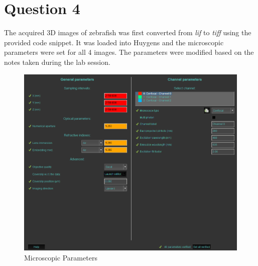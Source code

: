 \documentclass{article}
\begin{document}
\clearpage
\section*{Question 4}
The acquired 3D images of zebrafish was first converted from  \textit{lif} to \textit{tiff} using the provided code snippet. It was loaded into Huygens and the microscopic parameters were set for all 4 images. 
The parameters were modified based on the notes taken during the lab session. 
\begin{figure}[h!]
    \centering
    \includegraphics[width=0.85\linewidth]{Report/Images/parameters_set.png}
    \caption{Microscopic Parameters}
    \label{fig:microscope-parameters}
\end{figure}
\end{document}
